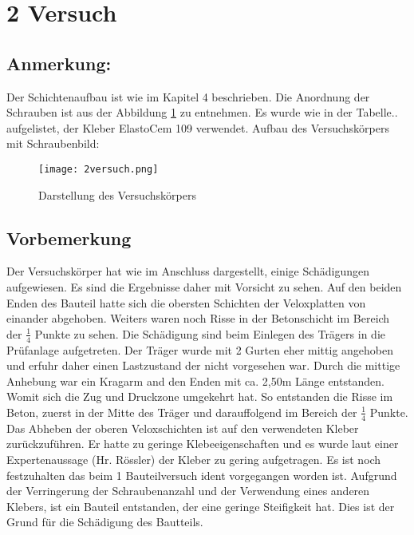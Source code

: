 \documentclass[12 pt,a4 paper ]{scrreprt}
\begin{document}
\section{2 Versuch}

\subsection{Anmerkung:}

Der Schichtenaufbau ist wie im Kapitel 4 beschrieben. Die Anordnung der Schrauben ist aus der Abbildung \ref{2versuch} zu entnehmen. Es wurde wie in der Tabelle..  aufgelistet, der Kleber ElastoCem 109  verwendet. 
Aufbau des Versuchskörpers mit Schraubenbild:


\begin{figure}
\begin{center}
\texttt{[image: 2versuch.png]}
\caption{Darstellung des Versuchskörpers}
\label{2versuch}
\end{center}
\end{figure}

\clearpage{}
\subsection{Vorbemerkung}

Der Versuchskörper hat wie im Anschluss dargestellt, einige Schädigungen aufgewiesen. Es sind die Ergebnisse daher mit Vorsicht zu sehen. Auf den beiden Enden des Bauteil hatte sich die obersten Schichten der Veloxplatten von einander abgehoben. Weiters waren noch Risse in der Betonschicht im Bereich der $\frac{1}{4}$ Punkte zu sehen.
Die Schädigung sind beim Einlegen des Trägers in die Prüfanlage aufgetreten. Der Träger wurde mit 2 Gurten eher mittig angehoben und erfuhr daher einen Lastzustand der nicht vorgesehen war. Durch die mittige Anhebung war ein Kragarm and den Enden  mit ca. 2,50m Länge entstanden. Womit sich die Zug und Druckzone umgekehrt hat. So entstanden die Risse im Beton, zuerst in der Mitte des Träger und darauffolgend im Bereich der $\frac{1}{4}$ Punkte. Das Abheben der oberen Veloxschichten ist auf den verwendeten Kleber zurückzuführen. Er hatte zu geringe Klebeeigenschaften und es wurde laut einer Expertenaussage (Hr. Rössler)  der Kleber zu gering aufgetragen.
Es ist noch festzuhalten das beim 1 Bauteilversuch ident vorgegangen worden ist. Aufgrund der Verringerung der Schraubenanzahl und der Verwendung eines anderen Klebers, ist ein Bauteil entstanden, der eine geringe Steifigkeit hat. Dies ist der Grund für die Schädigung des Bautteils.
\end{document}

